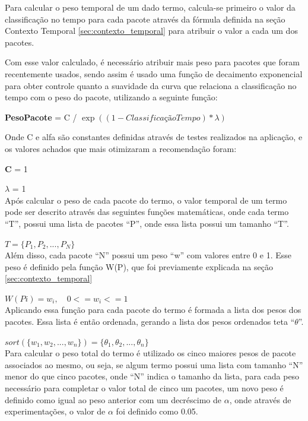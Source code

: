 Para calcular o peso temporal de um dado termo, calcula-se primeiro o valor da
classificação no tempo para cada pacote através da fórmula definida na seção
Contexto Temporal \ref{sec:contexto_temporal} para atribuir o valor
a cada um dos pacotes.

Com esse valor calculado, é necessário atribuir mais peso para pacotes que
foram recentemente usados, sendo assim é usado uma função de decaimento
exponencial para obter controle quanto a suavidade da curva que relaciona
a classificação no tempo com o peso do pacote, utilizando a seguinte função:

\textbf{PesoPacote} = C / $\exp\left(({1 - ClassificaçãoTempo}) * {\lambda}\right)$

Onde C e alfa são constantes definidas através de testes realizados na
aplicação, e os valores achados que mais otimizaram a recomendação foram:

\textbf{C} = 1

\textbf{$\lambda$} = 1
\\

Após calcular o peso de cada pacote do termo, o valor temporal de um termo pode ser
descrito através das seguintes funções matemáticas, onde cada termo ``T'', possui uma
lista de pacotes ``P'', onde essa lista possui um tamanho ``T''.

$T = \{P_1, P_2, ..., P_N\}$
\\

Além disso, cada pacote ``N'' possui um peso ``w'' com valores entre 0 e 1. Esse peso
é definido pela função W(P), que foi previamente explicada na seção
\ref{sec:contexto_temporal}

$W(Pi) = w_i , \quad 0 <= w_i <= 1$
\\

Aplicando essa função para cada pacote do termo é formada a lista dos pesos
dos pacotes. Essa lista é então ordenada, gerando a lista
dos pesos ordenados teta ``$\theta$''.

$sort(\{w_1, w_2, ..., w_n\}) = \{\theta_1, \theta_2, ..., \theta_n\}$
\\

Para calcular o peso total do termo é utilizado os cinco maiores pesos de pacote
associados ao mesmo, ou seja, se algum termo possui uma lista com tamanho ``N''
menor do que cinco pacotes, onde ``N'' indica o tamanho da lista, para cada peso
necessário para completar o valor total de cinco um pacotes, um novo peso
é definido como igual ao peso anterior com um decréscimo de $\alpha$, onde
através de experimentações, o valor de $\alpha$ foi definido como 0.05.

